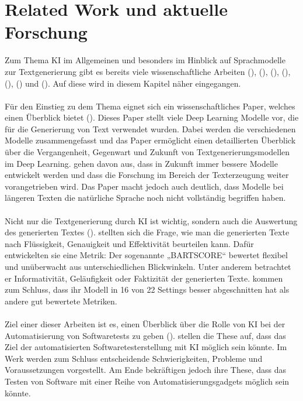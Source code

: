 \documentclass[12pt,toc=bib,toc=listof]{scrreprt}
\begin{document}
\chapter{Related Work und aktuelle Forschung} %
\label{sec:relatedWorkUndAktuelleForschung}
Zum Thema KI im Allgemeinen und besonders im Hinblick auf Sprachmodelle zur Textgenerierung gibt es bereits viele wissenschaftliche Arbeiten (\cite{Iqbal2022}), (\cite{Yuan2021}), (\cite{Khan2024}), (\cite{Bhandari2024}), (\cite{Gu2024}), (\cite{Chen2024}) und (\cite{Wang2024}). Auf diese wird in diesem Kapitel näher eingegangen.\\
\\
Für den Einstieg zu dem Thema eignet sich ein wissenschaftliches Paper, welches einen Überblick bietet (\cite{Iqbal2022}). Dieses Paper stellt viele Deep Learning Modelle vor, die für die Generierung von Text verwendet wurden. Dabei werden die verschiedenen Modelle zusammengefasst und das Paper ermöglicht einen detaillierten Überblick über die Vergangenheit, Gegenwart und Zukunft von Textgenerierungsmodellen im Deep Learning. \textcite{Iqbal2022} gehen davon aus, dass in Zukunft immer bessere Modelle entwickelt werden und dass die Forschung im Bereich der Texterzeugung weiter vorangetrieben wird. Das Paper macht jedoch auch deutlich, dass Modelle bei längeren Texten die natürliche Sprache noch nicht vollständig begriffen haben.\\
\\
Nicht nur die Textgenerierung durch KI ist wichtig, sondern auch die Auswertung des generierten Textes (\cite{Yuan2021}). \textcite{Yuan2021} stellten sich die Frage, wie man die generierten Texte nach Flüssigkeit, Genauigkeit und Effektivität beurteilen kann. Dafür entwickelten sie eine Metrik: Der sogenannte „BARTSCORE“ bewertet flexibel und unüberwacht aus unterschiedlichen Blickwinkeln. Unter anderem betrachtet er Informativität, Geläufigkeit oder Faktizität der generierten Texte. \textcite{Yuan2021} kommen zum Schluss, dass ihr Modell in 16 von 22 Settings besser abgeschnitten hat als andere gut bewertete Metriken.\\
\\
Ziel einer dieser Arbeiten ist es, einen Überblick über die Rolle von KI bei der Automatisierung von Softwaretests zu geben (\cite{Khan2024}). \textcite{Khan2024} stellen die These auf, dass das Ziel der automatisierten Softwaretesterstellung mit KI möglich sein könnte. Im Werk werden zum Schluss entscheidende Schwierigkeiten, Probleme und Voraussetzungen vorgestellt. Am Ende bekräftigen \textcite{Khan2024} jedoch ihre These, dass das Testen von Software mit einer Reihe von Automatisierungsgadgets möglich sein könnte.\\
\end{document}
